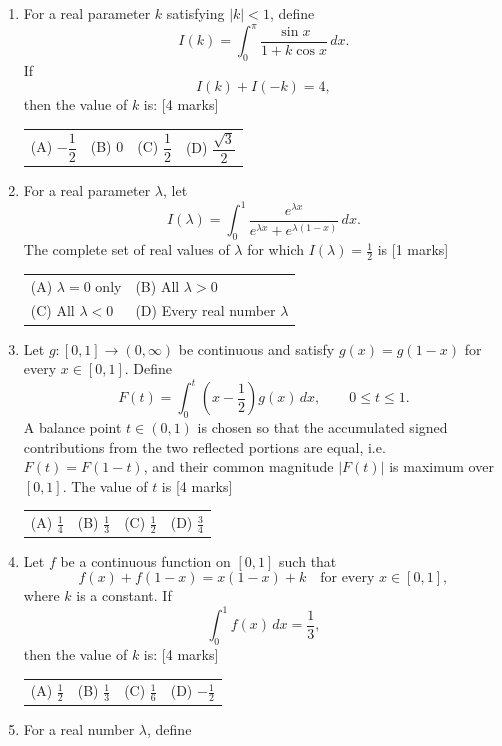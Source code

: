 \documentclass[11pt,a4paper]{article}
\begin{document}
\begin{enumerate}[resume]
\item For a real parameter $k$ satisfying $|k|<1$, define
\[
I(k)=\int_{0}^{\pi}\frac{\sin x}{1+k\cos x}\,dx.
\]
If
\[
I(k)+I(-k)=4,
\]
then the value of $k$ is: \hfill [4 marks]
{\renewcommand{\arraystretch}{1.8}
\begin{tabularx}{\linewidth}{X X X X}
(A) \quad $-\dfrac12$ & (B) \quad $0$ & (C) \quad $\dfrac12$ & (D) \quad $\dfrac{\sqrt3}{2}$ \\[10pt]
\end{tabularx}}
\item For a real parameter $\lambda$, let
\[
I(\lambda)=\int_{0}^{1}\frac{e^{\lambda x}}{e^{\lambda x}+e^{\lambda(1-x)}}\,dx.
\]
The complete set of real values of $\lambda$ for which $I(\lambda)=\frac12$ is \hfill [1 marks]
{\renewcommand{\arraystretch}{1.8}
\begin{tabularx}{\linewidth}{X X}
(A) \quad $\lambda=0$ only & (B) \quad All $\lambda>0$ \\[10pt]
(C) \quad All $\lambda<0$ & (D) \quad Every real number $\lambda$ \\[10pt]
\end{tabularx}}
\item Let $g:[0,1]\to(0,\infty)$ be continuous and satisfy $g(x)=g(1-x)$ for every $x\in[0,1]$. Define
\[
F(t)=\int_0^t\left(x-\frac12\right)g(x)\,dx,\qquad 0\le t\le1.
\]
A balance point $t\in(0,1)$ is chosen so that the accumulated signed contributions from the two reflected portions are equal, i.e. $F(t)=F(1-t)$, and their common magnitude $|F(t)|$ is maximum over $[0,1]$. The value of $t$ is \hfill [4 marks]
{\renewcommand{\arraystretch}{1.8}
\begin{tabularx}{\linewidth}{X X X X}
(A) \quad $\frac14$ & (B) \quad $\frac13$ & (C) \quad $\frac12$ & (D) \quad $\frac34$ \\[10pt]
\end{tabularx}}
\item Let $f$ be a continuous function on $[0,1]$ such that
\[
f(x)+f(1-x)=x(1-x)+k \quad \text{for every }x\in[0,1],
\]
where $k$ is a constant. If
\[
\int_0^1 f(x)\,dx=\frac{1}{3},
\]
then the value of $k$ is: \hfill [4 marks]
{\renewcommand{\arraystretch}{1.8}
\begin{tabularx}{\linewidth}{X X X X}
(A) \quad $\frac{1}{2}$ & (B) \quad $\frac{1}{3}$ & (C) \quad $\frac{1}{6}$ & (D) \quad $-\frac{1}{2}$ \\[10pt]
\end{tabularx}}
\item For a real number \(\lambda\), define

\end{enumerate}
\end{document}
